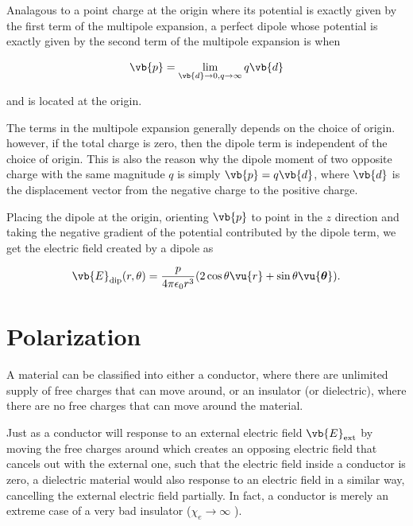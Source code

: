 \documentclass[english,a4paper,12pt]{report}
\begin{document}
Analagous to a point charge at the origin where its potential is exactly given by the first term of the multipole expansion, a perfect dipole whose potential is exactly given by the second term of the multipole expansion is when 

\begin{equation}
    \vb{p} = \lim_{\vb{d}  \to 0, q \to \infty} q\vb{d}  
\end{equation}

and is located at the origin. 

The terms in the multipole expansion generally depends on the choice of origin. however, if the total charge is zero, then the dipole term is independent of the choice of origin. This is also the reason why the dipole moment of two opposite charge with the same magnitude \(q\) is simply \(\vb{p} = q\vb{d} \), where \(\vb{d} \) is the displacement vector from the negative charge to the positive charge. 

Placing the dipole at the origin, orienting \(\vb{p} \) to point in the \(z\) direction and taking the negative gradient of the potential contributed by the dipole term, we get the electric field created by a dipole as

\begin{equation}
    \vb{E} _{\text{dip} } (r, \theta ) = \frac{p}{4\pi \epsilon _0 r^3 }(2\cos \theta \vu{r} + \sin \theta \vu{\boldsymbol{\theta } }). 
\end{equation}










\section{Polarization}

A material can be classified into either a conductor, where there are unlimited supply of free charges that can move around, or an insulator (or dielectric), where there are no free charges that can move around the material. 

Just as a conductor will response to an external electric field \(\vb{E} _{\text{ext} } \)  by moving the free charges around which creates an opposing electric field that cancels out with the external one, such that the electric field inside a conductor is zero, a dielectric material would also response to an electric field in a similar way, cancelling the external electric field partially. In fact, a conductor is merely an extreme case of a very bad insulator (\(\chi _{e} \to \infty\) ).
\end{document}
